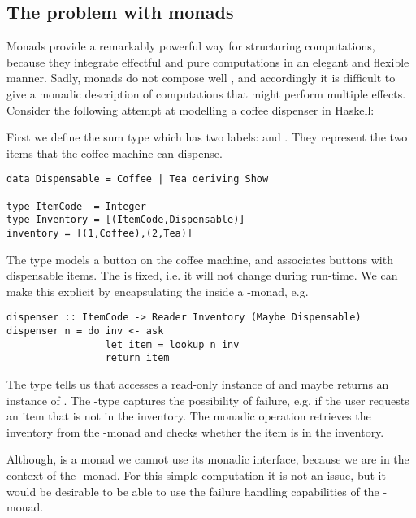 \subsection{The problem with monads}
Monads provide a remarkably powerful way for structuring computations, because they integrate effectful and pure computations in an elegant and flexible manner.
Sadly, monads do not compose well \cite{Kammar2013}, and accordingly it is difficult to give a monadic description of computations that might perform multiple effects.
Consider the following attempt at modelling a coffee dispenser in Haskell:
\begin{example}\label{ex:coffee1}
First we define the sum type  which has two labels:  and . They represent the two items that the coffee machine can dispense.
\begin{lstlisting}[style={haskell}]
data Dispensable = Coffee | Tea deriving Show

type ItemCode  = Integer
type Inventory = [(ItemCode,Dispensable)]
inventory = [(1,Coffee),(2,Tea)]
\end{lstlisting}
The  type models a button on the coffee machine, and  associates buttons with dispensable items. The  is fixed, i.e. it will not change during run-time. We can make this explicit by encapsulating the  inside a -monad, e.g.
\begin{lstlisting}[style={haskell}]
dispenser :: ItemCode -> Reader Inventory (Maybe Dispensable)
dispenser n = do inv <- ask
                 let item = lookup n inv
                 return item
\end{lstlisting}
The type  tells us that  accesses a read-only instance of  and maybe returns an instance of . The -type captures the possibility of failure, e.g. if the user requests an item that is not in the inventory. 
The monadic operation  retrieves the inventory from the -monad and  checks whether the item  is in the inventory.  

Although,  is a monad we cannot use its monadic interface, because we are in the context of the -monad. For this simple computation it is not an issue, but it would be desirable to be able to use the failure handling capabilities of the -monad.
\end{example}
